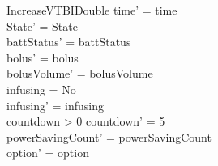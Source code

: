 \begin{schema}{IncreaseVTBIDouble}
	time' = time\\ 
	State' = State\\
	battStatus' = battStatus\\
	bolus' = bolus\\
	bolusVolume' = bolusVolume\\
	infusing = No\\
	infusing' = infusing\\
	countdown > 0 \land countdown' = 5\\
	powerSavingCount' = powerSavingCount\\ option' = option\\
\end{schema}

